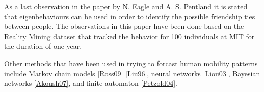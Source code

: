 As a last observation in the paper by N. Eagle and A. S. Pentland it is stated
that eigenbehaviours can be used in order to identify the possible friendship
ties between people. The observations in this paper have been done based on the
Reality Mining dataset that tracked the behavior for 100 individuals at MIT for
the duration of one year.


Other methods that have been used in trying to forcast human mobility patterns
include Markov chain models \ref{Ross09} \ref{Liu96}, neural networks
\ref{Liou03}, Bayesian networks \ref{Akoush07}, and finite automaton
\ref{Petzold04}.


